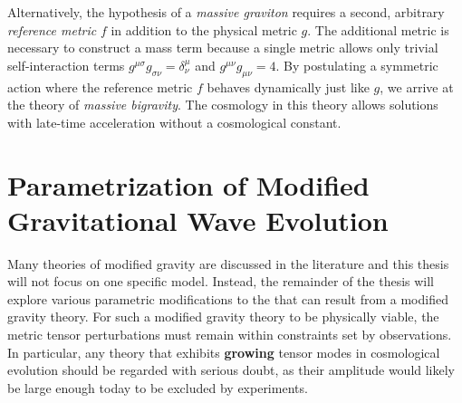 \documentclass[parskip=half]{scrreprt}
\begin{document}
Alternatively, the hypothesis of a \emph{massive graviton} requires a second, arbitrary \emph{reference metric} \(f\) in addition to the physical metric \(g\). The additional metric is necessary to construct a mass term because a single metric allows only trivial self-interaction terms \(g^{\mu\sigma}g_{\sigma\nu}=\delta^\mu_\nu\) and \(g^{\mu\nu}g_{\mu\nu} = 4\). By postulating a symmetric action where the reference metric \(f\) behaves dynamically just like \(g\), we arrive at the theory of \emph{massive bigravity}.
The cosmology in this theory allows solutions with late-time acceleration without a cosmological constant. 




\chapter{Parametrization of Modified Gravitational Wave Evolution}\label{ch:param_mod_grav}

Many theories of modified gravity are discussed in the literature  and this thesis will not focus on one specific model. Instead, the remainder of the thesis will explore various parametric modifications to the  that can result from a modified gravity theory. For such a modified gravity theory to be physically viable, the metric tensor perturbations must remain within constraints set by observations. In particular, any theory that exhibits \textbf{growing} tensor modes in cosmological evolution should be regarded with serious doubt, as their amplitude would likely be large enough today to be excluded by experiments.  
\end{document}
